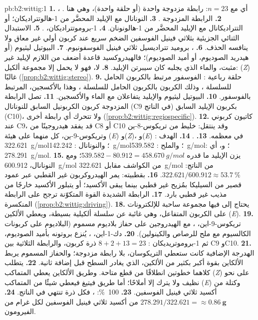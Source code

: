 \begin{solution}{pb:b2:wittig:1}
\textbf{1.} ، أي  مع $n = 23$: رابطة مزدوجة واحدة (أو حلقة واحدة)، وهي هنا
.
\textbf{2.} الرابطة المزدوجة .
\textbf{3.} النونانال  مع الإيليد المحضَّر من 1-هالوتتراديكان؛ أو التتراديكانال
 مع الإيليد المحضَّر من 1-هالونونان.
\textbf{4.} 1-بروموتتراديكان، .
\textbf{5.} الاستبدال الثنائي الجزيئية بثلاثي فينيل الفوسفين الضخم سريع عند كربون أولي غير معاق
ولا ينافسه الحذف.
\textbf{6.} ، بروميد تتراديسيل ثلاثي فينيل الفوسفونيوم.
\textbf{7.} البيوتيل ليثيوم (أو هيدريد الصوديوم، أو أميد الصوديوم)؛ فالهيدروكسيد قاعدة أضعف من اللازم
لإيليد غير مثبت، والماء الذي يجلبه كان سيبرتن الإيليد.
\textbf{8.} لا، فهو لا يحمل إلا مجموعة ألكيل: (\textit{Z}) غالبًا (\cref{prop:b2:wittig:stereo}).
\textbf{9.} حلقة رباعية : الفوسفور مرتبط بالكربون الحامل للسلسلة
، وذلك الكربون بالكربون الحامل للسلسلة ، وهذا بالأكسجين، المرتبط
بالفوسفور.
\textbf{10.} البيوتيل ليثيوم والإيليد يتفاعلان مع الماء والأكسجين.
\textbf{11.} تصل الرابطة المزدوجة كربون الكربونيل السابق للنونانال (C9 في الناتج) بكربون
الإيليد السابق (C10)، ولا تتحرك أي رابطة أخرى (\cref{prop:b2:wittig:regiospecific}).
\textbf{12.} كاتيون كربوني عند C9، قد يفقد هيدروجينًا من C8 أو C10 وقد ينتقل: خليط من
تريكوس-8-ين وتريكوس-9-ين، كل منهما على هيئة (\textit{E}) و(\textit{Z})، و(\textit{E}) في معظمه.
\textbf{13.} .
\textbf{14.} الهدف : \qty{322.621}{g/mol}؛ والنونانال : \qty{142.242}{g/mol}؛ والملح
: \qty{539.582}{g/mol}؛ و، أي : \qty{278.291}{g/mol}.
\textbf{15.} يزن الإيليد  ما قدره $539.582 - 80.912 = \qty{458.670}{g/mol}$؛ ومع النونانال،
\qty{600.912}{g/mol} من الكواشف مقابل \qty{322.621}{g/mol} من الناتج: $322.621/600.912 \approx
53.7~\%$.
\textbf{16.} بقطبيته: يمر الهيدروكربون غير القطبي عبر عمود قصير من السيليكا بمُزيح
غير قطبي بينما يبقى الأكسيد؛ أو يتبلور الأكسيد خارجًا من مذيب غير قطبي بارد.
\textbf{17.} الرابطة  الشديدة القوة المتكوّنة ترجح على الرابطة  المنكسرة
(\cref{prop:b2:wittig:driving}).
\textbf{18.} يحتاج إلى  فيها مجموعة ساحبة للإلكترونات على الكربون المتفاعل، وهي غائبة
عن سلسلة ألكيلية بسيطة، ويعطي الألكين (\textit{E}).
\textbf{19.} تريكوس-9-اين، ، مع الهيدروجين على حفاز بلاديوم
مسموم (البلاديوم على كربونات الكالسيوم مع ملح للرصاص والكينولين).
\textbf{20.} دك-1-اين، ، يُنزع بروتونه بأميد الصوديوم، ثم 1-بروموتريديكان
: $8 + 2 + 13 = 23$ ذرة كربون، والرابطة الثلاثية بين C9 وC10.
\textbf{21.} الهدرجة الإضافية كانت ستعطي التريكوسان، بلا رابطة مزدوجة؛ والحفاز المسموم
يربط الألكاين بقوة أكبر بكثير من الألكين، الذي يغادر السطح قبل إضافة ثانية.
\textbf{22.} يتطلب كلاهما خطوتين انطلاقًا من قطع متاحة. وطريق الألكاين يعطي المتماكب (\textit{Z})
على نحو نظيف ولا يترك إلا أملاحًا؛ أما طريق فيتيغ فيعطي شيئًا من المتماكب (\textit{E}) وكتلة من
أكسيد ثلاثي فينيل الفوسفين.
\textbf{23.} 100~\%: ، فكل ذرة تنتهي في الناتج.
\textbf{24.} $278.291/322.621 = \boldsymbol{\approx \qty{0.86}{g}}$ من أكسيد ثلاثي فينيل الفوسفين لكل
غرام من الفيرومون.
\end{solution}

